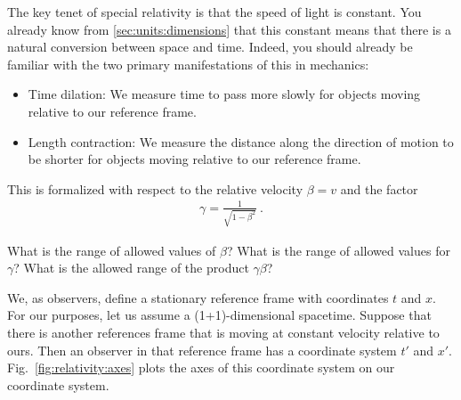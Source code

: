 \documentclass[12pt, oneside]{report}    %
\begin{document}
The key tenet of special relativity is that the speed of light is constant. You already know from \eqref{sec:units:dimensions} that this constant means that there is a natural conversion between space and time. Indeed, you should already be familiar with the two primary manifestations of this in mechanics:
\begin{itemize}
    \item Time dilation: We measure time to pass more slowly for objects moving relative to our reference frame.
    \item Length contraction: We measure the distance along the direction of motion to be shorter for objects moving relative to our reference frame. 
\end{itemize}
This is formalized with respect to the relative velocity $\beta = v$ and the factor
\begin{align}
    \gamma = \frac{1}{\sqrt{1-\beta^2}} \ .
\end{align}
\begin{exercise}
What is the range of allowed values of $\beta$? What is the range of allowed values for $\gamma$? What is the allowed range of the product $\gamma\beta$?
\end{exercise}
We, as observers, define a stationary reference frame with coordinates $t$ and $x$. For our purposes, let us assume a (1+1)-dimensional spacetime. Suppose that there is another references frame that is moving at constant velocity relative to ours. Then an observer in that reference frame has a coordinate system $t'$ and $x'$. Fig.~\ref{fig:relativity:axes} plots the axes of this coordinate system on our coordinate system. 
\end{document}
